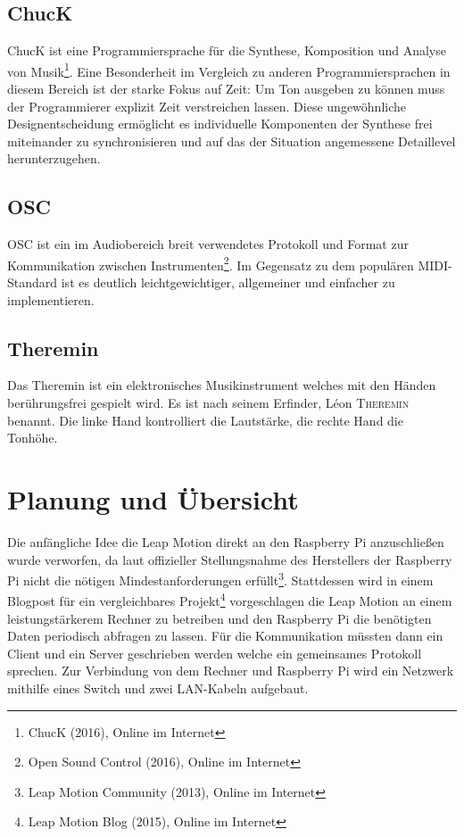 \documentclass[a4paper, fontsize=12pt, toc=bibliographynumbered]{scrreprt}
\newcommand{\person}[2]{#1 \textsc{#2}}
\begin{document}
\section{ChucK}

ChucK ist eine Programmiersprache für die Synthese, Komposition und
Analyse von Musik\footnote{ChucK (2016), Online im Internet}.  Eine
Besonderheit im Vergleich zu anderen Programmiersprachen in diesem
Bereich ist der starke Fokus auf Zeit: Um Ton ausgeben zu können muss
der Programmierer explizit Zeit verstreichen lassen.  Diese
ungewöhnliche Designentscheidung ermöglicht es individuelle
Komponenten der Synthese frei miteinander zu synchronisieren und auf
das der Situation angemessene Detaillevel herunterzugehen.

\section{\ac{OSC}}

OSC ist ein im Audiobereich breit verwendetes Protokoll und Format zur
Kommunikation zwischen Instrumenten\footnote{Open Sound Control
  (2016), Online im Internet}.  Im Gegensatz zu dem populären
\ac{MIDI}-Standard ist es deutlich leichtgewichtiger, allgemeiner und
einfacher zu implementieren.

\section{Theremin}

Das Theremin ist ein elektronisches Musikinstrument welches mit den
Händen berührungsfrei gespielt wird.  Es ist nach seinem Erfinder,
\person{Léon}{Theremin} benannt.  Die linke Hand kontrolliert die
Lautstärke, die rechte Hand die Tonhöhe.

\chapter{Planung und Übersicht}

Die anfängliche Idee die Leap Motion direkt an den Raspberry Pi
anzuschließen wurde verworfen, da laut offizieller Stellungsnahme des
Herstellers der Raspberry Pi nicht die nötigen Mindestanforderungen
erfüllt\footnote{Leap Motion Community (2013), Online im Internet}.
Stattdessen wird in einem Blogpost für ein vergleichbares
Projekt\footnote{Leap Motion Blog (2015), Online im Internet}
vorgeschlagen die Leap Motion an einem leistungstärkerem Rechner zu
betreiben und den Raspberry Pi die benötigten Daten periodisch
abfragen zu lassen.  Für die Kommunikation müssten dann ein Client und
ein Server geschrieben werden welche ein gemeinsames Protokoll
sprechen.  Zur Verbindung von dem Rechner und Raspberry Pi wird ein
Netzwerk mithilfe eines Switch und zwei \ac{LAN}-Kabeln aufgebaut.
\end{document}
